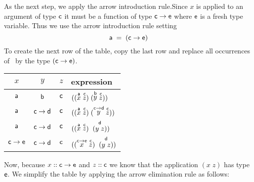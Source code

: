 \documentclass[11pt]{article}
\begin{document}
As the next step, we apply the arrow introduction rule.Since $x$ is applied to
an argument of type ${\sf{c}}$ it must be a function of type
${\sf{c}}\rightarrow{}{\sf{e}}$ where ${\sf{e}}$ is a fresh type variable. Thus we use the
arrow introduction rule setting
\[{\sf{a}} \;=\; ({\sf{c}}\rightarrow{\sf{e}})\]
To create the next row of the table, copy the last row and replace all
occurrences of \sfa~by the type $({\sf{c}}\rightarrow{\sf{e}})$.
\begin{center}
\begin{tabular}{ccc|l}
$x$ & $y$ & $z$ & expression \\\hline{}
${\sf{a}}$ & ${\sf{b}}$ & ${\sf{c}}$ &$((\stackrel{{\sf{a}}}{x} \; \stackrel{{\sf{c}}}{z})\; (\stackrel{{\sf{b}}}{y} \; \stackrel{{\sf{c}}}{z}))$ \\
${\sf{a}}$ & ${\sf{c}}\rightarrow{}{\sf{d}}$ & ${\sf{c}}$ &$((\stackrel{{\sf{a}}}{x} \; \stackrel{{\sf{c}}}{z})\; (\stackrel{{\sf{c}}\rightarrow{}{\sf{d}}}{y} \; \stackrel{{\sf{c}}}{z}))$ \\
${\sf{a}}$ & ${\sf{c}}\rightarrow{}{\sf{d}}$ & ${\sf{c}}$ &$((\stackrel{{\sf{a}}}{x} \; \stackrel{{\sf{c}}}{z})\; \stackrel{{\sf{d}}}{(y\;z)})$ \\
${\sf{c}}\rightarrow{\sf{e}}$ & ${\sf{c}}\rightarrow{}{\sf{d}}$ & ${\sf{c}}$ &$((\stackrel{{\sf{c}}\rightarrow{\sf{e}}}{x} \; \stackrel{{\sf{c}}}{z})\; \stackrel{{\sf{d}}}{(y\;z)})$ \\
\end{tabular}
\end{center}

Now, because $x::{\sf{c}}\rightarrow{}{\sf{e}}$ and $z::{\sf{c}}$ we know that the
application $(x\;z)$ has type ${\sf{e}}$.  We simplify the table by applying the
arrow elimination rule as follows:
\end{document}

